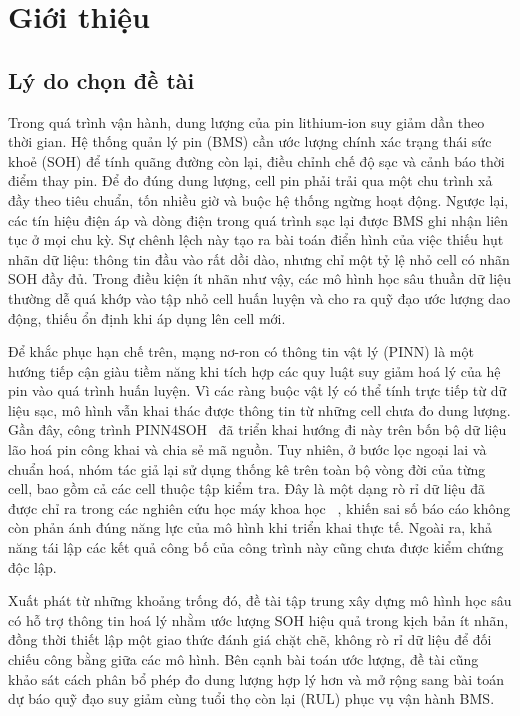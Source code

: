 \chapter{Giới thiệu}
\label{chap:introduction}

\noindent
\section{Lý do chọn đề tài}
Trong quá trình vận hành, dung lượng của pin lithium-ion suy giảm dần theo thời gian. 
Hệ thống quản lý pin (BMS) cần ước lượng chính xác trạng thái sức khoẻ (SOH) để tính quãng đường còn lại, 
điều chỉnh chế độ sạc và cảnh báo thời điểm thay pin. Để đo đúng dung lượng, cell pin phải trải qua một chu trình xả đầy theo 
tiêu chuẩn, tốn nhiều giờ và buộc hệ thống ngừng hoạt động. Ngược lại, các tín hiệu điện áp và dòng điện trong quá trình sạc lại 
được BMS ghi nhận liên tục ở mọi chu kỳ. Sự chênh lệch này tạo ra bài toán điển hình của việc thiếu hụt nhãn dữ liệu: thông tin 
đầu vào rất dồi dào, nhưng chỉ một tỷ lệ nhỏ cell có nhãn SOH đầy đủ. Trong điều kiện ít nhãn như vậy, các mô hình học sâu thuần dữ liệu 
thường dễ quá khớp vào tập nhỏ cell huấn luyện và cho ra quỹ đạo ước lượng dao động, thiếu ổn định khi áp dụng lên cell mới.

Để khắc phục hạn chế trên, mạng nơ-ron có thông tin vật lý (PINN) là một hướng tiếp cận giàu tiềm năng khi tích hợp 
các quy luật suy giảm hoá lý của hệ pin vào quá trình huấn luyện. Vì các ràng buộc vật lý có thể tính trực tiếp từ dữ liệu sạc, 
mô hình vẫn khai thác được thông tin từ những cell chưa đo dung lượng. Gần đây, công trình PINN4SOH~\cite{wang2024} 
đã triển khai hướng đi này trên bốn bộ dữ liệu lão hoá pin công khai và chia sẻ mã nguồn. Tuy nhiên,
 ở bước lọc ngoại lai và chuẩn hoá, nhóm tác giả lại sử dụng thống kê trên toàn bộ vòng đời của từng cell, 
 bao gồm cả các cell thuộc tập kiểm tra. Đây là một dạng rò rỉ dữ liệu đã được chỉ ra trong các nghiên cứu học máy khoa học 
 ~\cite{kapoor2023}, khiến sai số báo cáo không còn phản ánh đúng năng lực của mô hình khi triển khai thực tế.
Ngoài ra, khả năng tái lập các kết quả công bố của công trình này cũng chưa được kiểm chứng độc lập. 

Xuất phát từ những khoảng trống đó, đề tài tập trung xây dựng mô hình học sâu có hỗ trợ thông tin hoá lý nhằm ước 
lượng SOH hiệu quả trong kịch bản ít nhãn, đồng thời thiết lập một giao thức đánh giá chặt chẽ, không rò rỉ dữ liệu 
để đối chiếu công bằng giữa các mô hình. Bên cạnh bài toán ước lượng, đề tài cũng khảo sát cách phân bổ phép đo dung 
lượng hợp lý hơn và mở rộng sang bài toán dự báo quỹ đạo suy giảm cùng tuổi thọ còn lại (RUL) phục vụ vận hành BMS.   
